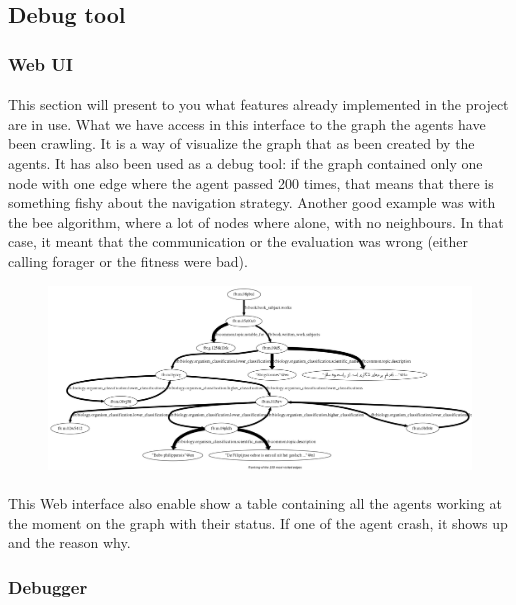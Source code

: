 \documentclass{article}
\begin{document}
	\subsection{Debug tool}
		\subsubsection{Web UI}
			\paragraph{}
				This section will present to you what features already implemented in the project are in use.
				What we have access in this interface to the graph the agents have been crawling.
				It is a way of visualize the graph that as been created by the agents.
				It has also been used as a debug tool: if the graph contained only one node with one edge where the agent passed 200 times,
				that means that there is something fishy about the navigation strategy.
				Another good example was with the bee algorithm, where a lot of nodes where alone, with no neighbours.
				In that case, it meant that the communication or the evaluation was wrong (either calling forager or the fitness were bad).
			\begin{figure}[!h]\hspace{2cm}
				\hspace{-2cm}
				\includegraphics[width=1.4\textwidth]{../dh_graph}
			\end{figure}
			\paragraph{}
				This Web interface also enable show a table containing all the agents working at the moment
				on the graph with their status.
				If one of the agent crash, it shows up and the reason why.
		\subsubsection{Debugger}
\end{document}
